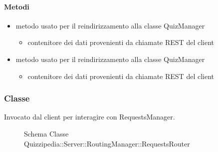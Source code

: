 \paragraph{Metodi}
\begin{itemize}
\item {}
\newline
metodo usato per il reindirizzamento alla classe QuizManager
\newline
{}
\newline
\begin{itemize}
\item {}
\newline
contenitore dei dati provenienti da chiamate REST del client
\end{itemize}
\item {}
\newline
metodo usato per il reindirizzamento alla classe QuizManager
\newline
{}
\newline
\begin{itemize}
\item {}
\newline
contenitore dei dati provenienti da chiamate REST del client
\end{itemize}
\end{itemize}
\subsubsection{Classe }
Invocato dal client per interagire con RequestsManager.
\begin{figure}[H]
\centering
\noindent{}
\caption[Schema Classe RequestsRouter]{Schema Classe Quizzipedia::Server::RoutingManager::RequestsRouter}
\end{figure}
